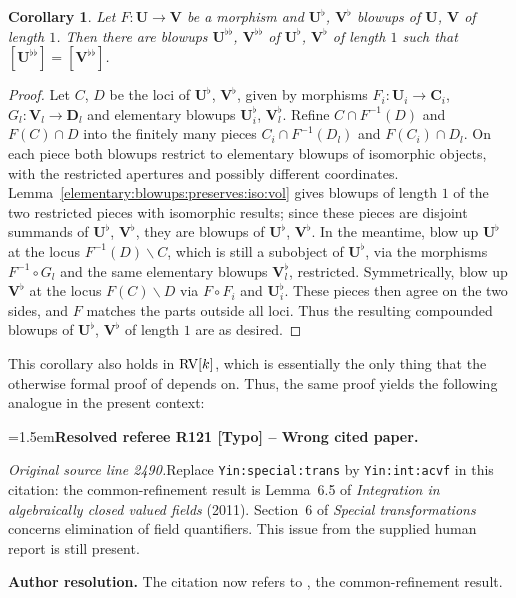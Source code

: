 \documentclass[12pt]{amsart}
\newcommand{\ResolvedRefereeRemark}[5]{%
  \par\medskip\begingroup\normalfont\small\color{gray}%
  \emergencystretch=1.5em\noindent\textbf{Resolved referee R#1 [#2] -- #3.}\par\nobreak\noindent #4\par
  \medskip\color{ResolutionGreen}\noindent\textbf{Author resolution.} #5\par
  \endgroup\medskip
}
\theoremstyle{plain}
\newtheorem{cor}[thm]{Corollary}
\theoremstyle{definition}
\theoremstyle{remark}
\numberwithin{equation}{section}
\theoremstyle{plain}
\newcommand{\RV}{\textup{RV}}
\newcommand{\0}{\emptyset}
\newcommand{\fun}{\longrightarrow}
\newcommand{\mi}{\smallsetminus}
\begin{document}
\begin{cor}\label{eblowup:same:loci:iso}
Let $F : \bm U \fun \bm V$ be a morphism and $\bm U^{\flat}$, $\bm V^{\flat}$ blowups of  $\bm U$, $\bm V$ of length $1$. Then there are blowups $\bm U^{\flat\flat}$, $\bm V^{\flat\flat}$ of $\bm U^{\flat}$, $\bm V^{\flat}$ of length $1$ such that $[\bm U^{\flat\flat}] = [\bm V^{\flat\flat}]$.
\end{cor}
\begin{proof}
Let $C$, $D$ be the loci of $\bm U^{\flat}$, $\bm V^{\flat}$, given by morphisms $F_i : \bm U_i \fun \bm C_i$, $G_l : \bm V_l \fun \bm D_l$ and elementary blowups $\bm U_i^{\flat}$, $\bm V_l^{\flat}$. Refine $C \cap F^{-1}(D)$ and $F(C) \cap D$ into the finitely many pieces $C_i \cap F^{-1}(D_l)$ and $F(C_i) \cap D_l$. On each piece both blowups restrict to elementary blowups of isomorphic objects, with the restricted apertures and possibly different coordinates. Lemma~\ref{elementary:blowups:preserves:iso:vol} gives blowups of length $1$ of the two restricted pieces with isomorphic results; since these pieces are disjoint summands of $\bm U^{\flat}$, $\bm V^{\flat}$, they are blowups of $\bm U^{\flat}$, $\bm V^{\flat}$. In the meantime, blow up $\bm U^{\flat}$ at the locus $F^{-1}(D) \mi C$, which is still a subobject of $\bm U^{\flat}$, via the morphisms $F^{-1} \circ G_l$ and the same elementary blowups $\bm V_l^{\flat}$, restricted. Symmetrically, blow up $\bm V^{\flat}$ at the locus $F(C) \mi D$ via $F \circ F_i$ and $\bm U_i^{\flat}$. These pieces then agree on the two sides, and $F$ matches the parts outside all loci. Thus the resulting compounded blowups of $\bm U^{\flat}$, $\bm V^{\flat}$ of length $1$ are as desired.
\end{proof}


This corollary also holds in $\RV[k]$, which is essentially the only thing that the otherwise formal proof of \cite[Lemma~6.5]{Yin:int:acvf} depends on. Thus, the same proof yields the following analogue in the present context:

\ResolvedRefereeRemark{121}{Typo}{Wrong cited paper}{%
\textit{Original source line 2490.}\quad Replace \texttt{Yin:special:trans} by \texttt{Yin:int:acvf} in this citation: the common-refinement result is Lemma~6.5 of \emph{Integration in algebraically closed valued fields} (2011). Section~6 of \emph{Special transformations} concerns elimination of field quantifiers. This issue from the supplied human report is still present.
}{The citation now refers to \cite[Lemma~6.5]{Yin:int:acvf}, the common-refinement result.}
\end{document}
